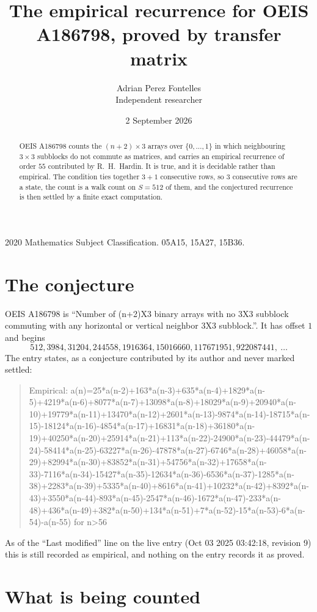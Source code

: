 \documentclass[11pt,a4paper]{article}
\title{The empirical recurrence for OEIS A186798, proved by transfer matrix}
\author{Adrian Perez Fontelles\\ \small Independent researcher}
\date{2 September 2026}
\theoremstyle{plain}
\theoremstyle{definition}
\begin{document}
\maketitle

\begin{abstract}
OEIS A186798 counts the $(n+2)\times3$ arrays over $\{0,\dots,1\}$ in which
neighbouring $3\times3$ subblocks do not commute as matrices, and carries an empirical recurrence
of order $55$ contributed by R.~H.~Hardin. It is true, and it is decidable rather than
empirical. The condition ties together $3+1$ consecutive rows, so $3$ consecutive rows are
a state, the count is a walk count on $S=512$ of them, and the conjectured recurrence is then
settled by a finite exact computation.
\end{abstract}

\noindent\small 2020 Mathematics Subject Classification. 05A15, 15A27, 15B36.\normalsize

\section{The conjecture}

OEIS A186798 is ``Number of (n+2)X3 binary arrays with no 3X3 subblock commuting with any horizontal or vertical neighbor 3X3 subblock.''. It has offset $1$ and begins
\[
512, 3984, 31204, 244558, 1916364, 15016660, 117671951, 922087441,\ \dots
\]
The entry states, as a conjecture contributed by its author and never marked settled:
\begin{quote}
Empirical: a(n)=25*a(n-2)+163*a(n-3)+635*a(n-4)+1829*a(n-5)+4219*a(n-6)+8077*a(n-7)+13098*a(n-8)+18029*a(n-9)+20940*a(n-10)+19779*a(n-11)+13470*a(n-12)+2601*a(n-13)-9874*a(n-14)-18715*a(n-15)-18124*a(n-16)-4854*a(n-17)+16831*a(n-18)+36180*a(n-19)+40250*a(n-20)+25914*a(n-21)+113*a(n-22)-24900*a(n-23)-44479*a(n-24)-58414*a(n-25)-63227*a(n-26)-47878*a(n-27)-6746*a(n-28)+46058*a(n-29)+82994*a(n-30)+83852*a(n-31)+54756*a(n-32)+17658*a(n-33)-7116*a(n-34)-15427*a(n-35)-12634*a(n-36)-6536*a(n-37)-1285*a(n-38)+2283*a(n-39)+5335*a(n-40)+8616*a(n-41)+10232*a(n-42)+8392*a(n-43)+3550*a(n-44)-893*a(n-45)-2547*a(n-46)-1672*a(n-47)-233*a(n-48)+436*a(n-49)+382*a(n-50)+134*a(n-51)+7*a(n-52)-15*a(n-53)-6*a(n-54)-a(n-55) for n>56
\end{quote}
As of the ``Last modified'' line on the live entry (Oct 03 2025 03:42:18, revision 9) this is still
recorded as empirical, and nothing on the entry records it as proved.

\section{What is being counted}
\end{document}

